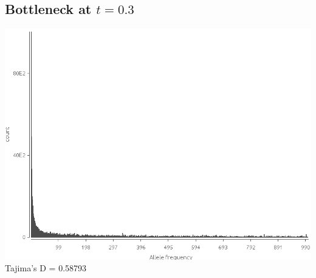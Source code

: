 \documentclass{article}
\begin{document}
\subsection{Bottleneck at $t=0.3$}
\includegraphics[width=\textwidth]{bottleneck}
Tajima's D = 0.58793
\end{document}

